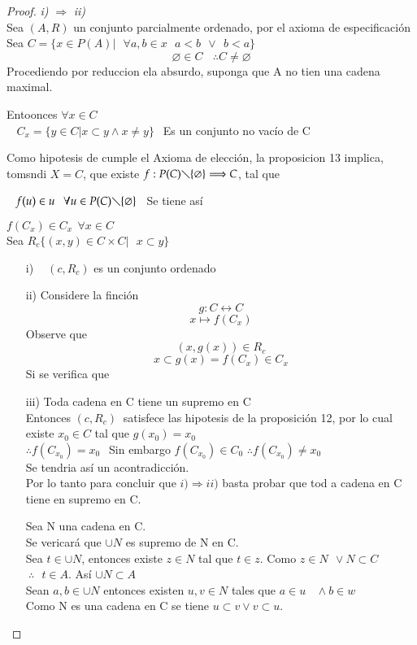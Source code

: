  \begin{proof}
 \textit{i)} $ \Rightarrow $ \textit{ii)}\\
 Sea $(A,R)$ un conjunto parcialmente ordenado, por el axioma de especificación\\
 Sea $ C= \lbrace x \in P(A) \vert \ \ \ \forall a,b \in x  \ \ \ a < b \ \  \vee \ \  b < a \rbrace $
 $$ \varnothing \in C \ \ \ \  \therefore C \neq  \varnothing $$
 Procediendo por reduccion ela absurdo, suponga que A no tien una cadena maximal.
 
Entoonces $ \forall x \in C $\\
$ \ \ \ \  C_{x} = \lbrace y  \in C \vert x \subset y \wedge x \neq y \rbrace \ \ $ Es  un conjunto no vacío de C
 
Como hipotesis de cumple el Axioma de elección, la proposicion 13 implica, tomsndi $ X=C $, que existe 
$  f:  P(C)  \diagdown  \lbrace \varnothing \rbrace \Longrightarrow C $, tal  que 

$\ \ \ f(u) \in u \ \  \ \forall u \in  P(C) \diagdown \lbrace \varnothing \rbrace  \ \ $ Se tiene así 

$ f(C_{x}) \in C_{x} \ \ \forall  x \in C $\\


Sea $ R_{c} \lbrace (x,y) \in C  \times C \vert \ \ \ x \subset y \rbrace  $
\begin{itemize}
\item[i)]  $ \ \ \ \ (c, R_{c})  $ es un conjunto ordenado
\item[ii)]Considere la finción  $$ g: C \longleftrightarrow C $$ 
$$ x \mapsto f(C_{x})  $$ Observe que\\
$$ (x,g(x)) \in R_{c} $$
$$ x \subset g(x) = f(C_{x}) \in C_{x} $$
Si se verifica que 
\item[iii)] Toda cadena en C tiene un supremo  en C\\
Entonces $ (c,R_{c}) \ $ satisfece las hipotesis  de la proposición 12, por lo cual existe  $ x_{0} \in C$ tal que $ g(x_{0}) = x_{0} $ \\
$\therefore f(C_{x_{0}})=x_{0} \ \ $  Sin embargo $ f(C_{x_{0}}) \in C_{0} $ 
$ \therefore f(C_{x_{0}}) \neq x_{0} $ \\
 Se tendria así un acontradicción.\\

Por lo  tanto para concluir que $ i) \Rightarrow ii) $ basta probar que tod a cadena  en C tiene  en supremo en C.

Sea N  una cadena en C.\\
Se vericará que $ \cup N  $ es supremo de N en C.\\
Sea $ t \in  \cup N $, entonces existe $ z \in N $ tal que $ t \in z $. Como $ z \in N \ \  \vee N \subset C $\\
$ \ \therefore \ \ \ t \in A  $.  Así   $ \cup N \subset A  $ \\
Sean $ a,b \in \cup N $ entonces existen $ u,v \in N $ tales que $ a  \in u \  \ \ \  \wedge
 b \in w $\\
 Como N es una cadena en C se tiene $ u \subset v \vee v \subset u $. \\
  

\end{itemize}
\end{proof}
